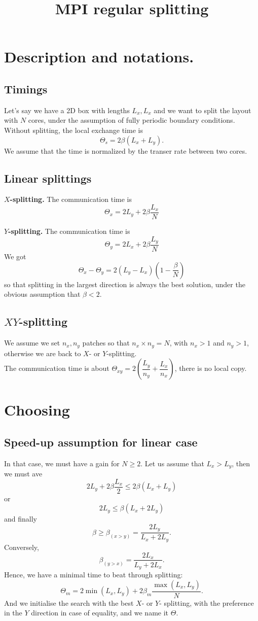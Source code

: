 \documentclass[aps]{revtex4}
\begin{document}
\title{MPI regular splitting}
\maketitle
	
\section{Description and notations.}
\subsection{Timings}
Let's say we have a 2D box with lengths $L_x,L_x$ and
we want to split the layout with $N$ cores, under the assumption
of fully periodic boundary conditions.\\

Without splitting, the local exchange time is
$$
	\Theta_s =  2\beta \left(L_x+L_y\right).	
$$
We assume that the time is normalized
by the transer rate between two cores.

\subsection{Linear splittings}

\textbf{$X$-splitting.}
The communication time is
$$
	\Theta_x =  2 L_y + 2\beta \dfrac{L_x}{N}
$$

\textbf{$Y$-splitting.}
The communication time is
$$
	\Theta_y = 2 L_x + 2\beta \dfrac{L_y}{N}
$$
We got
$$
	\Theta_x - \Theta_y = 2\left(L_y-L_x\right)\left(1-\dfrac{\beta}{N}\right)
$$	
so that splitting in the largest direction is always the best solution, under
the obvious assumption that $\beta<2$.

\subsection{$XY$-splitting} 
We assume we set $n_x,n_y$ patches so that $n_x\times n_y=N$,
with $n_x>1$ and $n_y>1$, otherwise we are back to $X$- or $Y$-splitting.\\
The communication time is about $\Theta_{xy}=2\left(\dfrac{L_y}{n_y}+\dfrac{L_x}{n_x}\right)$,
there is no local copy.

\section{Choosing}
\subsection{Speed-up assumption for linear case}
In that case, we must have a gain for $N\geq2$.
Let us assume that $L_x>L_y$, then we must ave
$$
	 2 L_y + 2\beta \dfrac{L_x}{2} \leq 2\beta \left(L_x+L_y\right)
$$
or
$$
	2 L_y \leq \beta \left(L_x+2L_y\right)
$$
and finally
$$
	\beta \geq \beta_{(x>y)}= \dfrac{2L_y}{L_x+2L_y}.
$$
Conversely, 
$$
	\beta_{(y>x)}=\dfrac{2L_x}{L_y+2L_x}.
$$
Hence, we have a minimal time to beat through splitting:
$$	
	\Theta_m = 2  \min(L_x,L_y) + 2\beta_m \dfrac{\max(L_x,L_y)}{N}.
$$
And we initialise the search with the best $X$- or $Y$- splitting, 
with the preference in the $Y$ direction in case of equality, and we name it $\Theta$.
 
\end{document}
